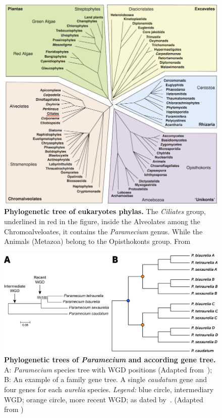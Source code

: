 \documentclass[10pt]{article}
\begin{document}
\begin{figure}[!ht]
\begin{center}
\includegraphics[scale=2.2]{Figures/TreeOfEuk.png}
\end{center}
\caption{
{\bf Phylogenetic tree of eukaryotes phylas.} The \textit{Ciliates} group, underlined in red in the figure, inside the Alveolates among the Chromoalveloates, it contains the \textit{Paramecium} genus. While the Animals (Metazoa) belong to the Opisthokonts group. From~\citep{keeling_tree_2005}
} 
\label{fig:TreeOfEuk}
\end{figure}


\begin{figure}[!ht]
\begin{center}
\includegraphics[scale=0.7]{Figures/SpeciesGene.png}
\end{center}
\caption{
{\bf Phylogenetic trees of \textit{Paramecium} and according gene tree.} A: \textit{Paramecium} species tree with WGD positions (Adapted from~\citealt{mcgrath_insights_2014}); B: An example of a family gene tree. A single \textit{caudatum} gene and four genes for each \textit{aurelia} species. \textit{Legend:} blue circle, intermediary WGD; orange circle, more recent WGD; as dated by~\citep{aury_global_2006}. (Adapted from \citealt{mcgrath_insights_2014})
}
\label{fig:DuplicationTree}
\end{figure}
\end{document}
